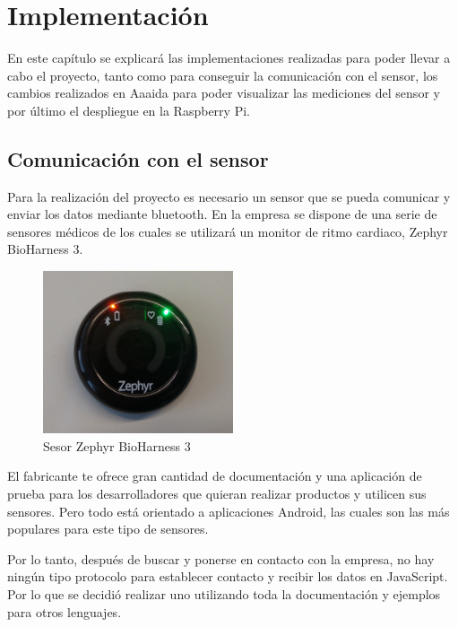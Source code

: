 \chapter{Implementación}

En este capítulo se explicará las implementaciones realizadas para poder llevar a cabo el proyecto, tanto como para conseguir la comunicación con el sensor, los cambios realizados en Aaaida para poder visualizar las mediciones del sensor y por último el despliegue en la Raspberry Pi. 

\section{Comunicación con el sensor}

Para la realización del proyecto es necesario un sensor que se pueda comunicar y enviar los datos mediante bluetooth. En la empresa se dispone de una serie de sensores médicos de los cuales se utilizará un monitor de ritmo cardiaco, Zephyr BioHarness 3. 

\begin{figure}[htb]
\begin{center}
\includegraphics[width=0.5\textwidth]{./setup/zephyr}
\caption{Sesor Zephyr BioHarness 3}
\end{center}
\end{figure}

El fabricante te ofrece gran cantidad de documentación y una aplicación de prueba para los desarrolladores que quieran realizar productos y utilicen sus sensores. Pero todo está orientado a aplicaciones Android, las cuales son las más populares para este tipo de sensores. 

Por lo tanto, después de buscar y ponerse en contacto con la empresa, no hay ningún tipo protocolo para establecer contacto y recibir los datos en JavaScript. Por lo que se decidió realizar uno utilizando toda la documentación y ejemplos para otros lenguajes. 

